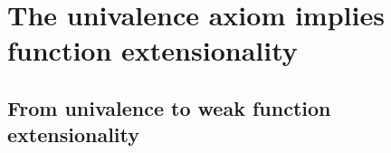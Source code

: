 \begin{comment}
\begin{cor}\label{cor:total_equiv_fiber_equiv}
For $\tau:\prod(x:A),\ P(x)\to Q(x)$, the function $\Sigma_A\tau$ is an equivalence if and only if $\tau(x)$ is an equivalence for each $x:A$. 
\end{cor}

Another useful basic equivalence is the following:

\begin{lem}\label{lem:hfiber_projone_is_fiber}
Suppose $P:A\to\type$ is a dependent type. Then there is an equivalence $\mathsf{hFiber}(\proj{1},a)\simeq P(a)$ for any $a:A$.
\end{lem}
\end{comment}

\chapter{The univalence axiom implies function extensionality}

\section{From univalence to weak function extensionality}

